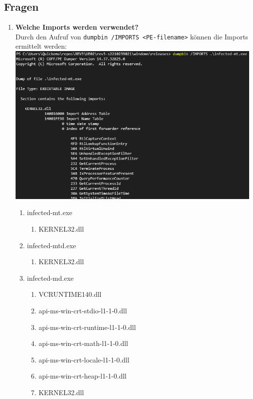 \documentclass{article}
\begin{document}
	\subsection*{Fragen}
	\begin{enumerate}
		\item \textbf{Welche Imports werden verwendet?}\\
		Durch den Aufruf von \texttt{dumpbin /IMPORTS <PE-filename>} können die Imports ermittelt werden:\\
		\includegraphics[width=1\linewidth]{pictures/1. example imports}
		\begin{enumerate}
			\item infected-mt.exe
			\begin{enumerate}
				\item KERNEL32.dll
			\end{enumerate}
			\item infected-mtd.exe
			\begin{enumerate}
				\item KERNEL32.dll
			\end{enumerate}
			\item infected-md.exe
			\begin{enumerate}
				\item VCRUNTIME140.dll
				\item api-ms-win-crt-stdio-l1-1-0.dll
				\item api-ms-win-crt-runtime-l1-1-0.dll
				\item api-ms-win-crt-math-l1-1-0.dll
				\item api-ms-win-crt-locale-l1-1-0.dll
				\item api-ms-win-crt-heap-l1-1-0.dll
				\item KERNEL32.dll

\end{enumerate}
\end{enumerate}
\end{enumerate}
\end{document}
